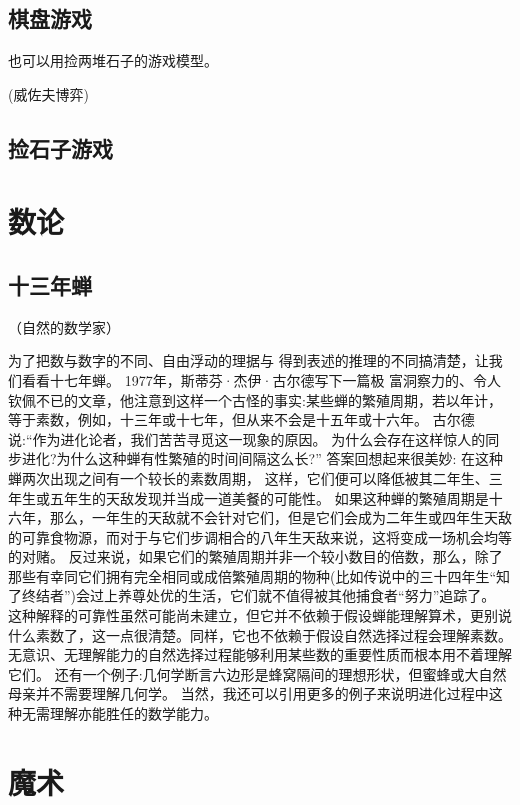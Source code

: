 \documentclass[export, 12pt, letterpaper]{ctexrep}
\begin{document}
\section{棋盘游戏}
也可以用捡两堆石子的游戏模型。

(威佐夫博弈)


\section{捡石子游戏}




\chapter{数论}


\section{十三年蝉}
（自然的数学家）

为了把数与数字的不同、自由浮动的理据与 得到表述的推理的不同搞清楚，让我们看看十七年蝉。
1977年，斯蒂芬·杰伊·古尔德写下一篇极 富洞察力的、令人钦佩不已的文章，他注意到这样一个古怪的事实:某些蝉的繁殖周期，若以年计，等于素数，例如，十三年或十七年，但从来不会是十五年或十六年。
古尔德说:“作为进化论者，我们苦苦寻觅这一现象的原因。
为什么会存在这样惊人的同步进化?为什么这种蝉有性繁殖的时间间隔这么长?”
答案回想起来很美妙: 在这种蝉两次出现之间有一个较长的素数周期， 这样，它们便可以降低被其二年生、三年生或五年生的天敌发现并当成一道美餐的可能性。
如果这种蝉的繁殖周期是十六年，那么，一年生的天敌就不会针对它们，但是它们会成为二年生或四年生天敌的可靠食物源，而对于与它们步调相合的八年生天敌来说，这将变成一场机会均等的对赌。
反过来说，如果它们的繁殖周期并非一个较小数目的倍数，那么，除了那些有幸同它们拥有完全相同或成倍繁殖周期的物种(比如传说中的三十四年生“知了终结者”)会过上养尊处优的生活，它们就不值得被其他捕食者“努力”追踪了。
这种解释的可靠性虽然可能尚未建立，但它并不依赖于假设蝉能理解算术，更别说什么素数了，这一点很清楚。同样，它也不依赖于假设自然选择过程会理解素数。
无意识、无理解能力的自然选择过程能够利用某些数的重要性质而根本用不着理解它们。
还有一个例子:几何学断言六边形是蜂窝隔间的理想形状，但蜜蜂或大自然母亲并不需要理解几何学。
当然，我还可以引用更多的例子来说明进化过程中这种无需理解亦能胜任的数学能力。




\chapter{魔术}
\end{document}
